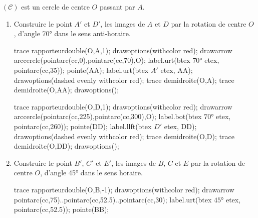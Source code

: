 \begin{corrige}
    $(\mathcal{C})$ est un cercle de centre $O$ passant par $A$.

    \begin{enumerate}
        \item Construire le point $A'$ et $D'$, les images de $A$ et $D$ par la rotation de centre $O$, d'angle \ang{70} dans le sens anti-horaire.
            \begin{Geometrie}[CoinHD={(7u,6u)}]    
                \enonceTroisiemeGTroisExoDix
                trace rapporteurdouble(O,A,1);        
                drawoptions(withcolor red);
                drawarrow arccercle(pointarc(cc,0),pointarc(cc,70),O);
                label.urt(btex $\ang{70}$ etex, pointarc(cc,35));    
                pointe(AA);
                label.urt(btex $A'$ etex, AA);    
                drawoptions(dashed evenly withcolor red);
                trace demidroite(O,A);
                trace demidroite(O,AA);
                drawoptions();        
            \end{Geometrie}
            \begin{Geometrie}[CoinHD={(7u,6u)}]    
                \enonceTroisiemeGTroisExoDix
                trace rapporteurdouble(O,D,1);
                drawoptions(withcolor red);
                drawarrow arccercle(pointarc(cc,225),pointarc(cc,300),O);
                label.bot(btex $\ang{70}$ etex, pointarc(cc,260));    
                pointe(DD);
                label.llft(btex $D'$ etex, DD);    
                drawoptions(dashed evenly withcolor red);
                trace demidroite(O,D);
                trace demidroite(O,DD);
                drawoptions();
            \end{Geometrie}    
        \item Construire le point $B'$, $C'$ et $E'$, les images de $B$, $C$ et $E$ par la rotation de centre $O$, d'angle \ang{45} dans le sens horaire.
            \begin{Geometrie}[CoinHD={(7u,6u)}]    
                \enonceTroisiemeGTroisExoDix
                trace rapporteurdouble(O,B,-1);
                drawoptions(withcolor red);
                drawarrow pointarc(cc,75)..pointarc(cc,52.5)..pointarc(cc,30);
                label.urt(btex $\ang{45}$ etex, pointarc(cc,52.5));    
                pointe(BB);

\end{Geometrie}
\end{enumerate}
\end{corrige}
